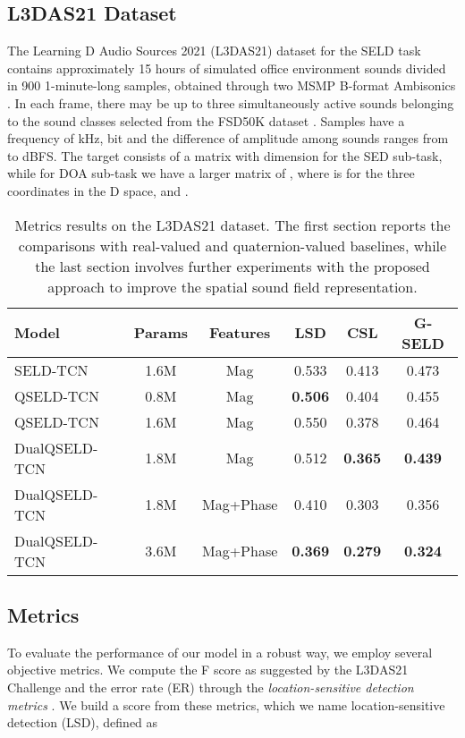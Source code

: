 \documentclass[3p, preprint, twocolumn]{elsarticle}
\begin{document}
\subsection{L3DAS21 Dataset}
The Learning D Audio Sources 2021 (L3DAS21) dataset for the SELD task contains approximately 15 hours of simulated office environment sounds divided in 900 1-minute-long samples, obtained through two MSMP B-format Ambisonics \cite{guizzo2021l3das21}. In each frame, there may be up to three simultaneously active sounds belonging to the  sound classes selected from the FSD50K dataset \cite{Fonseca2022FSD50KAO}. Samples have a frequency of  kHz,  bit and the difference of amplitude among sounds ranges from  to  dBFS. The target consists of a matrix with dimension  for the SED sub-task, while for DOA sub-task we have a larger matrix of , where  is for the three  coordinates in the D space,  and .

\begin{table*}[]
\caption{Metrics results on the L3DAS21 dataset. The first section reports the comparisons with real-valued and quaternion-valued baselines, while the last section involves further experiments with the proposed approach to improve the spatial sound field representation.}
\label{tab:metrics2}
\centering
\begin{tabular}{l|cc|ccc}
\toprule
Model & Params & Features & LSD & CSL & G-SELD \\\hline 
SELD-TCN & 1.6M & Mag & 0.533 & 0.413 & 0.473 \\ QSELD-TCN & 0.8M & Mag & \textbf{0.506} & 0.404 & 0.455 \\ QSELD-TCN & 1.6M & Mag & 0.550 & 0.378 & 0.464 \\ DualQSELD-TCN & 1.8M & Mag & 0.512 & \textbf{0.365} &  \textbf{0.439} \\ \hline
DualQSELD-TCN & 1.8M & Mag+Phase &  0.410 & 0.303 & 0.356 \\ DualQSELD-TCN & 3.6M & Mag+Phase &  \textbf{0.369} & \textbf{0.279} & \textbf{0.324} \\ \bottomrule
\end{tabular}
\end{table*}

\subsection{Metrics}
To evaluate the performance of our model in a robust way, we employ several objective metrics. We compute the F score as suggested by the L3DAS21 Challenge and the error rate (ER) through the \textit{location-sensitive detection metrics} \cite{guizzo2021l3das21, Guizzo2022L3DAS22CL}. We build a score from these metrics, which we name location-sensitive detection (LSD), defined as
\end{document}
